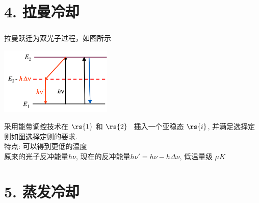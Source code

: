     \section{4. 拉曼冷却}

    \begin{frame} 
    \frametitle{}
    拉曼跃迁为双光子过程，如图所示
      \begin{center}
           \includegraphics[width=0.4\textwidth]{figs/31.png}
      \end{center}
    采用能带调控技术在 $\rs{1}$ 和 $\rs{2}$  插入一个亚稳态 $\rs{i} $, 并满足选择定则如图选择定则的要求.  \\ {\vspace*{2.3em}} 
    特点: 可以得到更低的温度 \\ 
    原来的光子反冲能量$h \nu $, 现在的反冲能量$h \nu' = h \nu - h \Delta \nu $, 低温量级 $\mu K$
    \end{frame}

    \section{5. 蒸发冷却}

